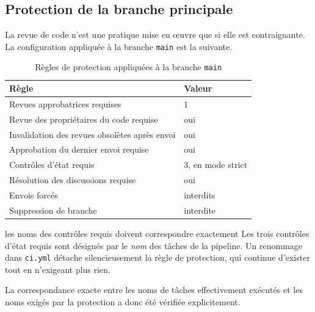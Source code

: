 \subsection{Protection de la branche principale}

La revue de code n'est une pratique mise en œuvre que si elle est contraignante.
La configuration appliquée à la branche \texttt{main} est la suivante.

\begin{table}[H]
\centering
\caption{Règles de protection appliquées à la branche \texttt{main}}
\label{tab:branch-protection}
\small
\begin{tabular}{@{}p{8.2cm}p{5.4cm}@{}}
\toprule
\textbf{Règle} & \textbf{Valeur} \\
\midrule
Revues approbatrices requises & 1 \\
Revue des propriétaires du code requise & oui \\
Invalidation des revues obsolètes après envoi & oui \\
Approbation du dernier envoi requise & oui \\
Contrôles d'état requis & 3, en mode strict \\
Résolution des discussions requise & oui \\
Envois forcés & interdits \\
Suppression de branche & interdite \\
\bottomrule
\end{tabular}
\end{table}

\begin{constat}{les noms des contrôles requis doivent correspondre exactement}
Les trois contrôles d'état requis sont désignés par le \emph{nom} des tâches de
la pipeline. Un renommage dans \texttt{ci.yml} détache silencieusement la règle
de protection, qui continue d'exister tout en n'exigeant plus rien.

La correspondance exacte entre les noms de tâches effectivement exécutés et les
noms exigés par la protection a donc été vérifiée explicitement.
\end{constat}


